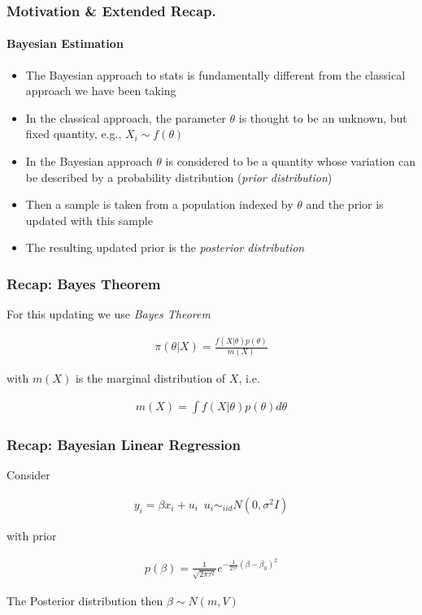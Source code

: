 \documentclass[
  shownotes,
  xcolor={svgnames},
  hyperref={colorlinks,citecolor=DarkBlue,linkcolor=DarkRed,urlcolor=DarkBlue}
  ]{beamer}
\begin{document}
\begin{frame}[fragile]
\frametitle{Motivation \& Extended Recap.}
\framesubtitle{Bayesian Estimation}

\begin{itemize}
\item The Bayesian approach to stats is fundamentally different from the classical approach we have been taking
\medskip
\item In the classical approach, the parameter $\theta$ is thought to be an unknown, but fixed quantity, e.g., $X_i\sim f(\theta)$
\medskip
\item In the Bayesian approach $\theta$ is considered to be a quantity whose variation can be described by a probability distribution  ({\it prior distribution})
\medskip
\item Then a sample is taken from a population indexed by $\theta$ and the prior is updated with this sample
\medskip
\item The resulting updated prior is the {\it posterior distribution}
\end{itemize}


\end{frame}
\begin{frame}[fragile]
\frametitle{Recap: Bayes Theorem}
For this updating we use {\it Bayes Theorem}

\bigskip
\begin{align}
\pi (\theta|X)=\frac{f(X|\theta)p(\theta)}{m(X)}
\end{align}

\bigskip
with $m(X)$ is the marginal distribution of $X$, i.e.

\begin{align}
m(X)=\int f(X|\theta)p(\theta)d\theta
\end{align}

\end{frame}
\begin{frame}[fragile]
\frametitle{Recap: Bayesian Linear Regression}

Consider

\begin{align}
y_i= \beta x_i+u_i\,\,\,u_i \sim_{iid} N(0,\sigma^2I)
\end{align}

with prior

\begin{align}
p(\beta)=\frac{1}{\sqrt{2\pi\tau^2}}e^{-\frac{1}{2\tau^2}{(\beta-\beta_0)^2}}
\end{align}

The Posterior distribution then  $\beta\sim N(m,V)$ 

\end{frame}
\end{document}

